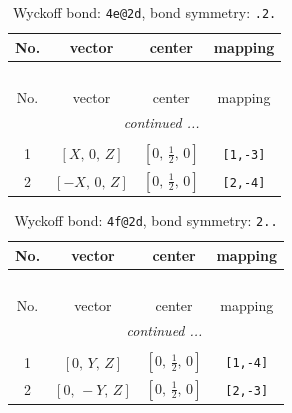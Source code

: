 \documentclass[fleqn,8pt]{jsarticle}
\begin{document}
\renewcommand{\arraystretch}{1.2}
\begin{longtable}{cccc}
\caption{Wyckoff bond: {\tt 4e@2d}, bond symmetry: {\tt .2.}}
 \\
 \hline \hline
No. & vector & center & mapping \\ \hline \endfirsthead

\multicolumn{3}{l}{\tablename\ \thetable{}} \\
 \hline \hline
No. & vector & center & mapping \\ \hline \endhead

 \hline \hline
\multicolumn{3}{r}{\footnotesize\it continued ...} \\ \endfoot

 \hline \hline
\multicolumn{3}{r}{} \\ \endlastfoot

1 & $\left[ X,\, 0,\, Z \right]$ & $\left[ 0,\, \frac{1}{2},\, 0 \right]$ & {\tt [1,-3]} \\ \hline
2 & $\left[ - X,\, 0,\, Z \right]$ & $\left[ 0,\, \frac{1}{2},\, 0 \right]$ & {\tt [2,-4]} \\
\end{longtable}
\renewcommand{\arraystretch}{1.2}
\begin{longtable}{cccc}
\caption{Wyckoff bond: {\tt 4f@2d}, bond symmetry: {\tt 2..}}
 \\
 \hline \hline
No. & vector & center & mapping \\ \hline \endfirsthead

\multicolumn{3}{l}{\tablename\ \thetable{}} \\
 \hline \hline
No. & vector & center & mapping \\ \hline \endhead

 \hline \hline
\multicolumn{3}{r}{\footnotesize\it continued ...} \\ \endfoot

 \hline \hline
\multicolumn{3}{r}{} \\ \endlastfoot

1 & $\left[ 0,\, Y,\, Z \right]$ & $\left[ 0,\, \frac{1}{2},\, 0 \right]$ & {\tt [1,-4]} \\ \hline
2 & $\left[ 0,\, - Y,\, Z \right]$ & $\left[ 0,\, \frac{1}{2},\, 0 \right]$ & {\tt [2,-3]} \\
\end{longtable}
\renewcommand{\arraystretch}{1.2}
\end{document}
